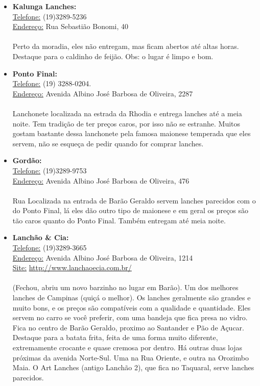 \begin{itemize}
\item  \textbf{Kalunga Lanches:}
\\\underline{Telefone:} (19)3289-5236
\\\underline{Endereço:} Rua Sebastião Bonomi, 40
\\\\Perto da moradia, eles não entregam, mas ficam abertos até altas horas. Destaque para o caldinho de feijão. Obs: o lugar é limpo e bom.
\end{itemize}

\begin{itemize}
\item  \textbf{Ponto Final:}
\\\underline{Telefone:} (19) 3288-0204.
\\\underline{Endereço:} Avenida Albino José Barbosa de Oliveira, 2287
\\\\Lanchonete localizada na estrada da Rhodia e entrega lanches até a meia noite. Tem tradição de ter preços caros, por isso não se estranhe. Muitos gostam bastante dessa lanchonete pela famosa maionese temperada que eles servem, não se esqueça de pedir quando for comprar lanches.
\end{itemize}

\begin{itemize}
\item  \textbf{Gordão:}
\\\underline{Telefone:} (19)3289-9753
\\\underline{Endereço:} Avenida Albino José Barbosa de Oliveira, 476
\\\\Rua Localizada na entrada de Barão Geraldo servem lanches parecidos com o do Ponto Final, lá eles dão outro tipo de maionese e em geral os preços são tão caros quanto do Ponto Final. Também entregam até meia noite.
\end{itemize}

\begin{itemize}
\item  \textbf{Lanchão \& Cia:}
\\\underline{Telefone:} (19)3289-3665
\\\underline{Endereço:} Avenida Albino José Barbosa de Oliveira, 1214
\\\underline{Site:} \url{http://www.lanchaoecia.com.br/}
\\\\(Fechou, abriu um novo barzinho no lugar em Barão). Um dos melhores lanches de Campinas (quiçá o melhor). Os lanches geralmente são grandes e muito bons, e os preços são compatíveis com a qualidade e quantidade. Eles servem no carro se você preferir, com uma bandeja que fica presa no vidro. Fica no centro de Barão Geraldo, proximo ao Santander e Pão de Açucar. Destaque para a batata frita, feita de uma forma muito diferente, extremamente crocante e quase cremosa por dentro. Há outras duas lojas próximas da avenida Norte-Sul. Uma na Rua Oriente, e outra na Orozimbo Maia. O Art Lanches (antigo Lanchão 2), que fica no Taquaral, serve lanches parecidos.
\end{itemize}

